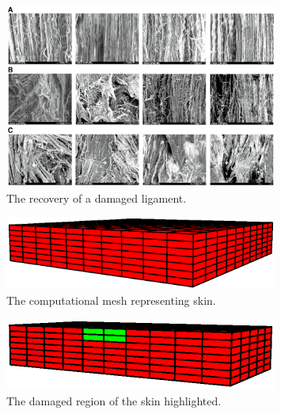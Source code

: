 

\begin{figure}[!hpt]
\centering
\includegraphics[width=0.8\textwidth]
                {images/experiments/healing-damaged-ligament} 
\caption{The recovery of a damaged ligament.}
\label{healing-damaged-ligament}
\end{figure}

\begin{figure}[!hpt]
\centering
\includegraphics[width=0.8\textwidth]
                {images/examples/lagrangian/healing/full-skin-mesh} 
\caption{The computational mesh representing skin.}
\label{healing-skin-mesh}
\end{figure}

\begin{figure}[!hpt]
\centering
\includegraphics[width=0.8\textwidth]
                {images/examples/lagrangian/healing/damaged-region} 
\caption{The damaged region of the skin highlighted.}
\label{healing-damaged-region}
\end{figure}

